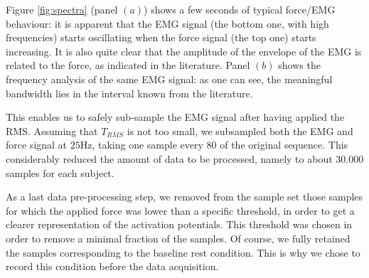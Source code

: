 Figure \ref{fig:spectra} (panel $(a)$) shows a few seconds of typical force/EMG behaviour: it is apparent that the EMG signal (the bottom one, with high frequencies) starts oscillating 
when the force signal (the top one) starts increasing. It is also quite clear that the amplitude of the envelope of the EMG is related to the force, as  
indicated in the literature. Panel $(b)$ shows the frequency analysis of the same EMG signal: as one can see, the meaningful bandwidth lies in the interval known from the literature.


This enables us to safely sub-sample the EMG signal after having applied the RMS. Assuming that $T_{RMS}$ is not too small, we
 subsampled both the EMG and force signal at $25$Hz, taking one sample every $80$ of the original sequence. 
This  considerably reduced the amount of data to be processed, namely to about $30.000$ samples for each subject.

As a last data pre-processing step, we removed from the sample set those samples for which the applied force was lower than a specific threshold, in order to get a clearer representation 
of the activation potentials. This threshold was chosen in order to remove a minimal fraction of the samples. Of course, we fully retained the samples corresponding to the baseline rest condition. 
This is why we chose to record this condition before the 
data acquisition.
